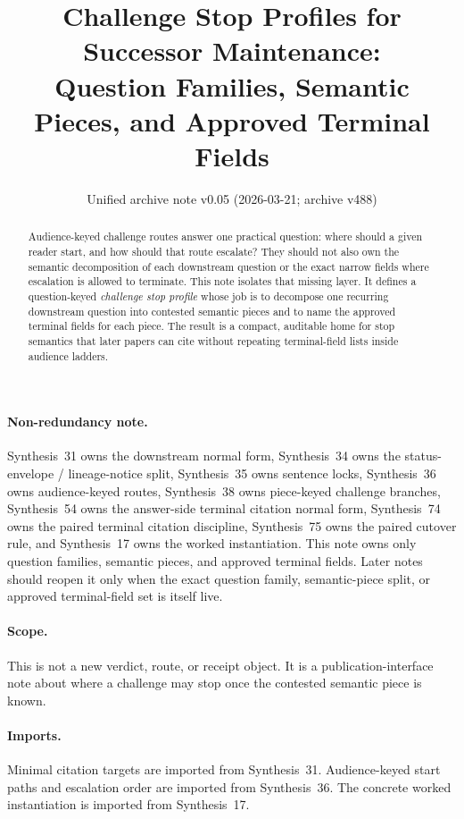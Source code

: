 \documentclass[11pt]{article}
\title{Challenge Stop Profiles for Successor Maintenance:\\[0.5ex]
\large Question Families, Semantic Pieces, and Approved Terminal Fields}
\author{}
\date{Unified archive note v0.05 (2026-03-21; archive v488)}
\begin{document}
\maketitle

\begin{abstract}
Audience-keyed challenge routes answer one practical question: where should a given reader start, and how should that route escalate?
They should not also own the semantic decomposition of each downstream question or the exact narrow fields where escalation is allowed to terminate.
This note isolates that missing layer.
It defines a question-keyed \emph{challenge stop profile} whose job is to decompose one recurring downstream question into contested semantic pieces and to name the approved terminal fields for each piece.
The result is a compact, auditable home for stop semantics that later papers can cite without repeating terminal-field lists inside audience ladders.
\end{abstract}

\paragraph{Non-redundancy note.}
Synthesis~31 owns the downstream normal form, Synthesis~34 owns the status-envelope / lineage-notice split, Synthesis~35 owns sentence locks, Synthesis~36 owns audience-keyed routes, Synthesis~38 owns piece-keyed challenge branches, Synthesis~54 owns the answer-side terminal citation normal form, Synthesis~74 owns the paired terminal citation discipline, Synthesis~75 owns the paired cutover rule, and Synthesis~17 owns the worked instantiation. This note owns only question families, semantic pieces, and approved terminal fields. Later notes should reopen it only when the exact question family, semantic-piece split, or approved terminal-field set is itself live.

\paragraph{Scope.}
This is not a new verdict, route, or receipt object. It is a publication-interface note about where a challenge may stop once the contested semantic piece is known.

\paragraph{Imports.}
Minimal citation targets are imported from Synthesis~31.\cite{series:downstreamnormalforms}
Audience-keyed start paths and escalation order are imported from Synthesis~36.\cite{series:challengeroutes}
The concrete worked instantiation is imported from Synthesis~17.\cite{series:workedexample}
\end{document}
